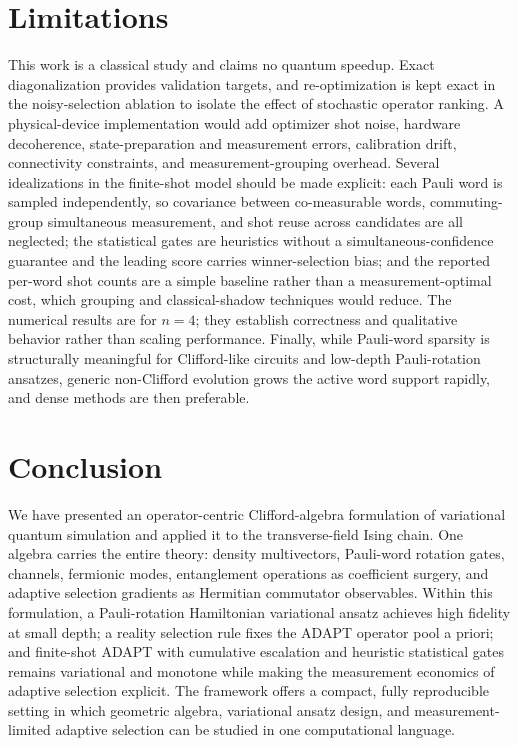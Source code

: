 \documentclass[11pt]{article}
\begin{document}
\section{Limitations}

This work is a classical study and claims no quantum speedup.  Exact diagonalization provides validation targets, and re-optimization is kept exact in the noisy-selection ablation to isolate the effect of stochastic operator ranking.  A physical-device implementation would add optimizer shot noise, hardware decoherence, state-preparation and measurement errors, calibration drift, connectivity constraints, and measurement-grouping overhead.  Several idealizations in the finite-shot model should be made explicit: each Pauli word is sampled independently, so covariance between co-measurable words, commuting-group simultaneous measurement, and shot reuse across candidates are all neglected; the statistical gates are heuristics without a simultaneous-confidence guarantee and the leading score carries winner-selection bias; and the reported per-word shot counts are a simple baseline rather than a measurement-optimal cost, which grouping and classical-shadow techniques would reduce.  The numerical results are for $n=4$; they establish correctness and qualitative behavior rather than scaling performance.  Finally, while Pauli-word sparsity is structurally meaningful for Clifford-like circuits and low-depth Pauli-rotation ansatzes, generic non-Clifford evolution grows the active word support rapidly, and dense methods are then preferable.

\section{Conclusion}

We have presented an operator-centric Clifford-algebra formulation of variational quantum simulation and applied it to the transverse-field Ising chain.  One algebra carries the entire theory: density multivectors, Pauli-word rotation gates, channels, fermionic modes, entanglement operations as coefficient surgery, and adaptive selection gradients as Hermitian commutator observables.  Within this formulation, a Pauli-rotation Hamiltonian variational ansatz achieves high fidelity at small depth; a reality selection rule fixes the ADAPT operator pool a priori; and finite-shot ADAPT with cumulative escalation and heuristic statistical gates remains variational and monotone while making the measurement economics of adaptive selection explicit.  The framework offers a compact, fully reproducible setting in which geometric algebra, variational ansatz design, and measurement-limited adaptive selection can be studied in one computational language.
\end{document}
